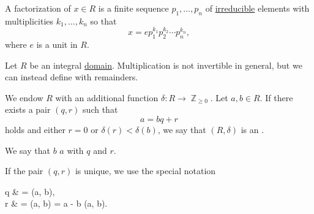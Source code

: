 \begin{definition}\label{def:factorization_in_ring}
  A factorization of \( x \in R \) is a finite sequence \( p_1, \ldots, p_n \) of \hyperref[def:irreducible_ring_element]{irreducible} elements with multiplicities \( k_1, \ldots, k_n \) so that
  \begin{equation*}
    x = e p_1^{k_1} p_2^{k_2} \cdots p_n^{k_n},
  \end{equation*}
  where \( e \) is a unit in \( R \).
\end{definition}

\begin{definition}\label{def:euclidean_domain}
  Let \( R \) be an integral \hyperref[def:semiring/integral_domain]{domain}. Multiplication is not invertible in general, but we can instead define  with remainders.

  We endow \( R \) with an additional function \( \delta: R \to \BbbZ_{\geq 0} \). Let \( a, b \in R \). If there exists a pair \( (q, r) \) such that
  \begin{equation*}
    a = bq + r
  \end{equation*}
  holds and either \( r = 0 \) or \( \delta(r) < \delta(b) \), we say that \( (R, \delta) \) is an .

  We say that \( b \)  \( a \) with  \( q \) and  \( r \).

  If the pair \( (q, r) \) is unique, we use the special notation
  \begin{balign*}
    q & = \quot(a, b),                    \\
    r & = \rem(a, b) = a - b \quot(a, b).
  \end{balign*}
\end{definition}

